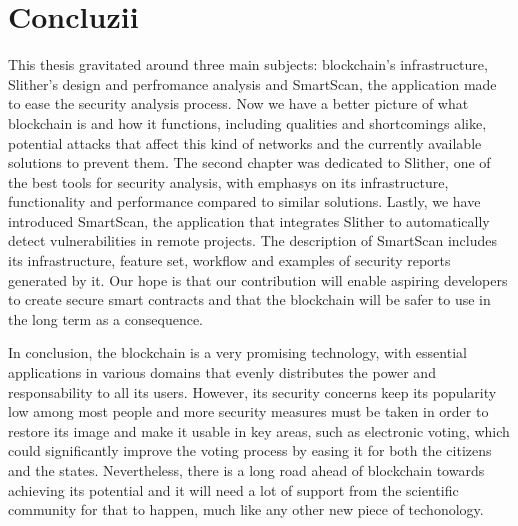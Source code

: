\chapter*{Concluzii} 

This thesis gravitated around three main subjects: blockchain's infrastructure, Slither's design and perfromance analysis and SmartScan, the application made to ease the security analysis process. Now we have a better picture of what blockchain is and how it functions, including qualities and shortcomings alike, potential attacks that affect this kind of networks and the currently available solutions to prevent them. The second chapter was dedicated to Slither, one of the best tools for security analysis, with emphasys on its infrastructure, functionality and performance compared to similar solutions. Lastly, we have introduced SmartScan, the application that integrates Slither to automatically detect vulnerabilities in remote projects. The description of SmartScan includes its infrastructure, feature set, workflow and examples of security reports generated by it. Our hope is that our contribution will enable aspiring developers to create secure smart contracts and that the blockchain will be safer to use in the long term as a consequence.

In conclusion, the blockchain is a very promising technology, with essential applications in various domains that evenly distributes the power and responsability to all its users. However, its security concerns keep its popularity low among most people and more security measures must be taken in order to restore its image and make it usable in key areas, such as electronic voting, which could significantly improve the voting process by easing it for both the citizens and the states. Nevertheless, there is a long road ahead of blockchain towards achieving its potential and it will need a lot of support from the scientific community for that to happen, much like any other new piece of techonology.



